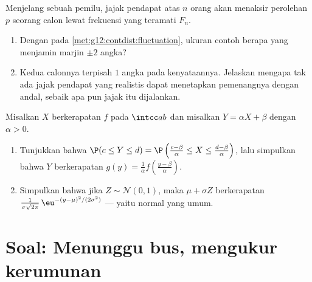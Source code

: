 \begin{exercise}[$\star\star\star$]\label{exo:g12:contdist:8}
Menjelang sebuah pemilu, jajak pendapat atas $n$ orang akan menaksir perolehan $p$ seorang
calon lewat frekuensi yang teramati $F_n$.
\begin{enumerate}
  \item Dengan  pada
        \cref{met:g12:contdist:fluctuation}, ukuran contoh berapa yang menjamin
        marjin $\pm 2$ angka?
  \item Kedua calonnya terpisah $1$ angka pada kenyataannya. Jelaskan mengapa
        tak ada jajak pendapat yang realistis dapat menetapkan pemenangnya dengan andal, sebaik
        apa pun jajak itu dijalankan.
\end{enumerate}
\end{exercise}

\begin{exercise}[$\star\star\star$]\label{exo:g12:contdist:9}
Misalkan $X$ berkerapatan $f$ pada $\intcc ab$ dan misalkan
$Y = \alpha X + \beta$ dengan $\alpha > 0$.
\begin{enumerate}
  \item Tunjukkan bahwa $\P(c \leq Y \leq d)
        = \P\left(\frac{c - \beta}{\alpha} \leq X \leq
        \frac{d-\beta}{\alpha}\right)$, lalu simpulkan bahwa $Y$ berkerapatan
        $g(y) = \frac{1}{\alpha} f\left(\frac{y - \beta}{\alpha}\right)$.
  \item Simpulkan bahwa jika $Z \sim \mathcal N(0,1)$, maka
        $\mu + \sigma Z$ berkerapatan
        $\frac{1}{\sigma\sqrt{2\pi}}\,
        \eu^{-(y - \mu)^2/(2\sigma^2)}$ --- yaitu  normal yang umum.
\end{enumerate}
\end{exercise}

\section{Soal: Menunggu bus, mengukur kerumunan}

